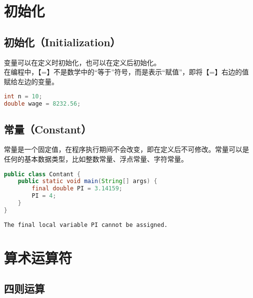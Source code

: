 \newpage

\section{初始化}

\subsection{初始化（Initialization）}

变量可以在定义时初始化，也可以在定义后初始化。\\

在编程中，【=】不是数学中的“等于”符号，而是表示“赋值”，即将【=】右边的值赋给左边的变量。

\vspace{-0.5cm}

\begin{lstlisting}[language=Java]
int n = 10;
double wage = 8232.56;
\end{lstlisting}

\vspace{0.5cm}

\subsection{常量（Constant）}

常量是一个固定值，在程序执行期间不会改变，即在定义后不可修改。常量可以是任何的基本数据类型，比如整数常量、浮点常量、字符常量。\\


\begin{lstlisting}[language=Java]
public class Contant {
    public static void main(String[] args) {
        final double PI = 3.14159;
        PI = 4;
    }
}
\end{lstlisting}

\begin{tcolorbox}
	\begin{verbatim}
The final local variable PI cannot be assigned.
	\end{verbatim}
\end{tcolorbox}

\newpage

\section{算术运算符}

\subsection{四则运算}

